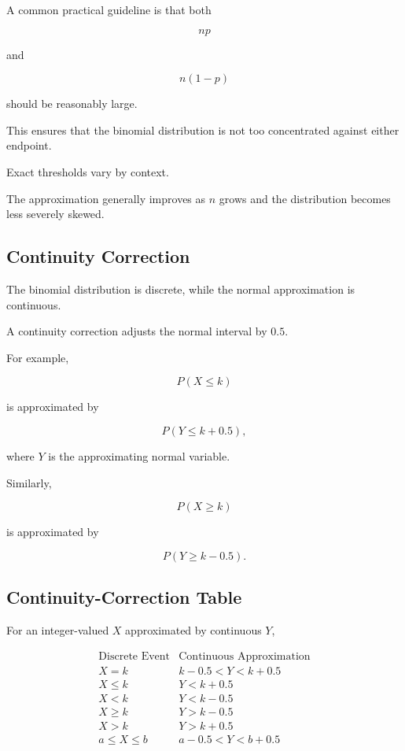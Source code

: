 A common practical guideline is that both

\[
np
\]

and

\[
n(1-p)
\]

should be reasonably large.

This ensures that the binomial distribution is not too concentrated
against either endpoint.

Exact thresholds vary by context.

The approximation generally improves as \(n\) grows and the
distribution becomes less severely skewed.

\subsection{Continuity Correction}
\label{subsec:continuity-correction-clt}

The binomial distribution is discrete, while the normal approximation
is continuous.

A continuity correction adjusts the normal interval by \(0.5\).

For example,

\[
P(X\leq k)
\]

is approximated by

\[
\boxed{
P(Y\leq k+0.5),
}
\]

where \(Y\) is the approximating normal variable.

Similarly,

\[
P(X\geq k)
\]

is approximated by

\[
\boxed{
P(Y\geq k-0.5).
}
\]

\subsection{Continuity-Correction Table}
\label{subsec:continuity-correction-table}

For an integer-valued \(X\) approximated by continuous \(Y\),

\[
\begin{array}{c|c}
\text{Discrete Event}
&
\text{Continuous Approximation}
\\
\hline
X=k
&
k-0.5<Y<k+0.5
\\[1mm]
X\leq k
&
Y<k+0.5
\\[1mm]
X<k
&
Y<k-0.5
\\[1mm]
X\geq k
&
Y>k-0.5
\\[1mm]
X>k
&
Y>k+0.5
\\[1mm]
a\leq X\leq b
&
a-0.5<Y<b+0.5
\end{array}
\]

